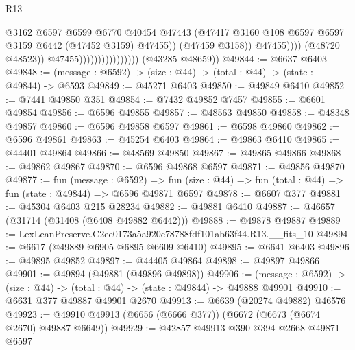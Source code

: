 \begin{lexlean}{R13}
\begin{coremodule}
                                                    @3162
                                                    @6597
                                                    @6599
                                                    @6770
                                                    @40454
                                                    @47443
                                                    (@47417
                                                      @3160
                                                      @108
                                                      @6597
                                                      @6597
                                                      @3159
                                                      @6442
                                                      (@47452 @3159)
                                                      @47455))
                                                  (@47459 @3158))
                                                @47455))))
                                        (@48720 @48523))
                                      @47455))))))))))))))))
      (@43285 @48659))
@49844 := @6637 @6403
@49848 := (message : @6592) -> (size : @44) -> (total : @44) -> (state : @49844) -> @6593
@49849 := @45271 @6403
@49850 := @49849 @6410
@49852 := @7441 @49850 @351
@49854 := @7432 @49852 @7457
@49855 := @6601 @49854
@49856 := @6596 @49855
@49857 := @48563 @49850
@49858 := @48348 @49857
@49860 := @6596 @49858 @6597
@49861 := @6598 @49860
@49862 := @6596 @49861
@49863 := @45254 @6403
@49864 := @49863 @6410
@49865 := @44401 @49864
@49866 := @48569 @49850
@49867 := @49865 @49866
@49868 := @49862 @49867
@49870 := @6596 @49868 @6597
@49871 := @49856 @49870
@49877 := fun (message : @6592) =>
  fun (size : @44) => fun (total : @44) => fun (state : @49844) => @6596 @49871 @6597
@49878 := @6607 @377
@49881 := @45304 @6403 @215 @28234
@49882 := @49881 @6410
@49887 := @46657 (@31714 (@31408 (@6408 @49882 @6442)))
@49888 := @49878 @49887
@49889 := LexLeanPreserve.C2ee0173a5a920c78788fdf101ab63f44.R13.__fits_10
@49894 := @6617 (@49889 @6905 @6895 @6609 @6410)
@49895 := @6641 @6403
@49896 := @49895 @49852
@49897 := @44405 @49864
@49898 := @49897 @49866
@49901 := @49894 (@49881 (@49896 @49898))
@49906 := (message : @6592) -> (size : @44) -> (total : @44) -> (state : @49844) -> @49888 @49901
@49910 := @6631 @377 @49887 @49901 @2670
@49913 := @6639 (@20274 @49882) @46576
@49923 := @49910 @49913 (@6656 (@6666 @377)) (@6672 (@6673 (@6674 @2670) @49887 @6649))
@49929 := @42857 @49913 @390 @394 @2668 @49871 @6597

\end{coremodule}
\end{lexlean}
